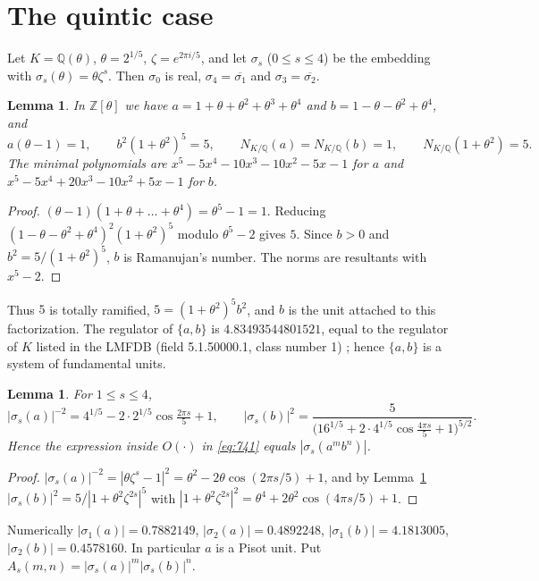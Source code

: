 \documentclass[11pt]{article}
\newtheorem{lemma}[theorem]{Lemma}
\theoremstyle{remark}
\newcommand{\Q}{\mathbb{Q}}
\newcommand{\Z}{\mathbb{Z}}
\begin{document}
\section{The quintic case}\label{sec:five}
Let $K=\Q(\theta)$, $\theta=2^{1/5}$, $\zeta=e^{2\pi i/5}$, and let $\sigma_s$ ($0\le s\le4$) be the embedding with
$\sigma_s(\theta)=\theta\zeta^s$. Then $\sigma_0$ is real, $\sigma_4=\overline{\sigma_1}$ and $\sigma_3=\overline{\sigma_2}$.

\begin{lemma}\label{lem:units}
In $\Z[\theta]$ we have $a=1+\theta+\theta^2+\theta^3+\theta^4$ and $b=1-\theta-\theta^2+\theta^4$, and
\[
a(\theta-1)=1,\qquad b^2(1+\theta^2)^5=5,\qquad N_{K/\Q}(a)=N_{K/\Q}(b)=1,\qquad N_{K/\Q}(1+\theta^2)=5 .
\]
The minimal polynomials are $x^5-5x^4-10x^3-10x^2-5x-1$ for $a$ and $x^5-5x^4+20x^3-10x^2+5x-1$ for $b$.
\end{lemma}

\begin{proof}
$(\theta-1)(1+\theta+\dots+\theta^4)=\theta^5-1=1$. Reducing $(1-\theta-\theta^2+\theta^4)^2(1+\theta^2)^5$ modulo
$\theta^5-2$ gives $5$. Since $b>0$ and $b^2=5/(1+\theta^2)^5$, $b$ is Ramanujan's number. The norms are resultants with $x^5-2$.
\end{proof}

Thus $5$ is totally ramified, $5=(1+\theta^2)^5b^2$, and $b$ is the unit attached to this factorization. The regulator of $\{a,b\}$
is $4.83493544801521$, equal to the regulator of $K$ listed in the LMFDB (field 5.1.50000.1, class number 1) \cite{LMFDB}; hence
$\{a,b\}$ is a system of fundamental units.

\begin{lemma}\label{lem:factors}
For $1\le s\le4$,
\[
|\sigma_s(a)|^{-2}=4^{1/5}-2\cdot2^{1/5}\cos\tfrac{2\pi s}5+1,\qquad
|\sigma_s(b)|^{2}=\frac5{\bigl(16^{1/5}+2\cdot4^{1/5}\cos\frac{4\pi s}5+1\bigr)^{5/2}} .
\]
Hence the expression inside $O(\cdot)$ in \eqref{eq:741} equals $|\sigma_s(a^mb^n)|$.
\end{lemma}

\begin{proof}
$|\sigma_s(a)|^{-2}=|\theta\zeta^s-1|^2=\theta^2-2\theta\cos(2\pi s/5)+1$, and by Lemma~\ref{lem:units}
$|\sigma_s(b)|^2=5/|1+\theta^2\zeta^{2s}|^5$ with $|1+\theta^2\zeta^{2s}|^2=\theta^4+2\theta^2\cos(4\pi s/5)+1$.
\end{proof}

Numerically $|\sigma_1(a)|=0.7882149$, $|\sigma_2(a)|=0.4892248$, $|\sigma_1(b)|=4.1813005$, $|\sigma_2(b)|=0.4578160$. In
particular $a$ is a Pisot unit. Put $A_s(m,n)=|\sigma_s(a)|^m|\sigma_s(b)|^n$.
\end{document}
